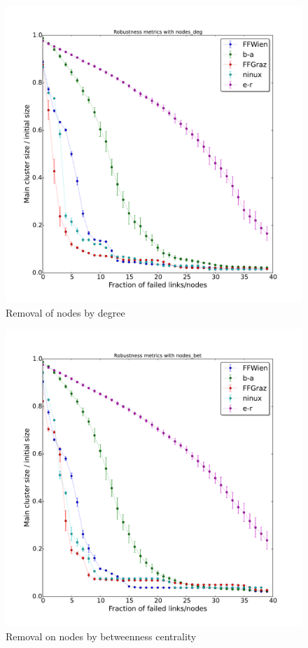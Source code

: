 \documentclass[a4paper,11pt,twoside,openleft]{memoir}
\begin{document}
\begin{figure}[htbp]
\centering
\includegraphics{graphs/nodes_deg_robustness}
\caption{Removal of nodes by degree}
\label{fig:node_deg}
\end{figure}

\begin{figure}[htbp]
\centering
\includegraphics{graphs/nodes_bet_robustness}
\caption{Removal on nodes by betweenness centrality}
\label{fig:node_bet}
\end{figure}
\end{document}
